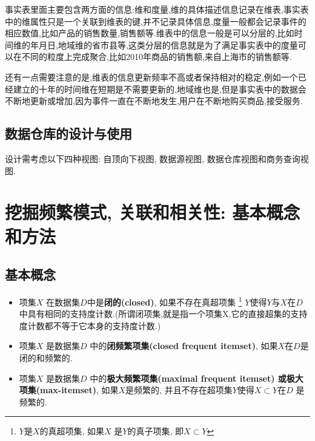 \documentclass{article}
\begin{document}
事实表里面主要包含两方面的信息:维和度量,维的具体描述信息记录在维表,事实表中的维属性只是一个关联到维表的键,并不记录具体信息,度量一般都会记录事件的相应数值,比如产品的销售数量,销售额等.维表中的信息一般是可以分层的,比如时间维的年月日,地域维的省市县等,这类分层的信息就是为了满足事实表中的度量可以在不同的粒度上完成聚合,比如2010年商品的销售额,来自上海市的销售额等.

还有一点需要注意的是,维表的信息更新频率不高或者保持相对的稳定,例如一个已经建立的十年的时间维在短期是不需要更新的,地域维也是,但是事实表中的数据会不断地更新或增加,因为事件一直在不断地发生,用户在不断地购买商品,接受服务.

\subsection{数据仓库的设计与使用}
设计需考虑以下四种视图: 自顶向下视图, 数据源视图, 数据仓库视图和商务查询视图.

\section{挖掘频繁模式, 关联和相关性: 基本概念和方法}
\subsection{基本概念}
\begin{itemize}
	\item 项集$X$ 在数据集$D$中是\textbf{闭的(closed)}, 如果不存在真超项集
\footnote{$Y$是$X$的真超项集, 如果$X$ 是$Y$的真子项集, 即$X \subset Y$}
$Y$使得$Y$与$X$在$D$中具有相同的支持度计数.(所谓闭项集,就是指一个项集X,它的直接超集的支持度计数都不等于它本身的支持度计数.)
	\item 项集$X$ 是数据集$D$ 中的\textbf{闭频繁项集(closed frequent itemset)}, 如果$X$在$D$是闭的和频繁的.\\
	\item 项集$X$ 是数据集$D$ 中的\textbf{极大频繁项集(maximal frequent itemset) 或极大项集(max-itemset)}, 如果$X$是频繁的, 并且不存在超项集$Y$使得$X \subset Y$在$D$ 是频繁的.
\end{itemize}
\end{document}

